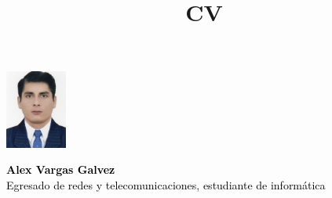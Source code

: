 \documentclass[11pt, oneside, a4paper, titlepage]{article}
\title{CV}
\begin{document}
	\begin{tcolorbox}
		\begin{minipage}{4.5cm}
			\hspace*{0.5cm}\includegraphics[width=2cm]{img004}
		\end{minipage}
		\begin{minipage}{15cm}
			\begin{center}
				\Huge{\textcolor{black}{\textbf{Alex Vargas Galvez}}}\\
				\vspace{0.5cm}
				\Large{\textcolor{black}{Egresado de redes y telecomunicaciones, estudiante de informática}}
			\end{center}			
		\end{minipage}
	\end{tcolorbox}
	
\end{document}
